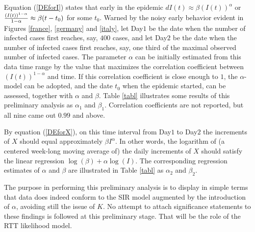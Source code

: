 \documentclass{article}
\begin{document}
\bigskip

Equation (\ref{DEforI}) states that early in the epidemic $dI(t) \approx \beta (I(t))^\alpha$ or ${{(I(t))^{1-\alpha}} \over  {1-\alpha}} \approx \beta (t-t_0)$ for some $t_0$. Warned by the noisy early behavior evident in Figures \ref{france}, \ref{germany} and \ref{italy}, let Day$1$ be the date when the number of infected cases first reaches, say, $400$ cases, and let Day$2$ be the date when the number of infected cases first reaches, say, one third of the maximal observed number of infected cases. The parameter $\alpha$ can be initially estimated from this data time range by the value that maximizes the correlation coefficient between $(I(t))^{1-\alpha}$ and time. If this correlation coefficient is close enough to $1$, the $\alpha$-model can be adopted, and the date $t_0$ when the epidemic started, can be assessed, together with $\alpha$ and $\beta$. Table \ref{tabl} illustrates some results of this preliminary analysis as $\alpha_1$ and $\beta_1$. Correlation coefficients are not reported, but all nine came out $0.99$ and above.

By equation (\ref{DEforX}), on this time interval from Day$1$ to Day$2$ the increments of $X$ should equal approximately $\beta I^\alpha$. In other words, the logarithm of (a centered week-long moving average of) the daily increments of $X$ should satisfy the linear regression $\log(\beta)+\alpha \log(I)$. The corresponding regression estimates of $\alpha$ and $\beta$ are illustrated in Table \ref{tabl} as $\alpha_2$ and $\beta_2$.

The purpose in performing this preliminary analysis is to display in simple terms that data does indeed conform to the SIR model augmented by the introduction of $\alpha$, avoiding still the issue of $K$. No attempt to attach significance statements to these findings is followed at this preliminary stage. That will be the role of the RTT likelihood model.
\end{document}
